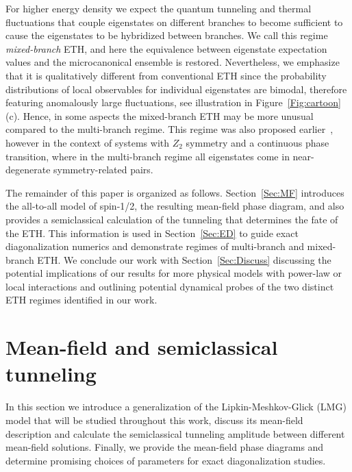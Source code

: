 \documentclass[aps,prx,showpacs,amsmath,amssymb,superscriptaddress,twocolumn,longbibliography,10pt,nofootinbib]{revtex4-2}
\begin{document}
For higher energy density we expect the quantum tunneling and thermal fluctuations that couple eigenstates on different branches to become sufficient to cause the eigenstates to be hybridized between branches. We call this regime \emph{mixed-branch} ETH, and here the equivalence between eigenstate expectation values and the microcanonical ensemble is restored. Nevertheless, we emphasize that it is qualitatively different from conventional ETH since the probability distributions of local observables for individual eigenstates are bimodal, therefore featuring anomalously large fluctuations, see illustration in Figure~\ref{Fig:cartoon}(c). Hence, in some aspects the mixed-branch ETH may be more unusual compared to the multi-branch regime. This regime was also proposed earlier~\cite{Huse14,Srednicki15,Srednicki16,SrednickiRigol2016}, however in the context of systems with $Z_2$ symmetry and a continuous phase transition, where in the multi-branch regime all eigenstates come in near-degenerate symmetry-related pairs.

The remainder of this paper is organized as follows. Section~\ref{Sec:MF} introduces the all-to-all model of spin-1/2, the resulting mean-field phase diagram, and also provides a semiclassical calculation of the tunneling that determines the fate of the ETH. This information is used in Section~\ref{Sec:ED} to  guide exact diagonalization numerics and demonstrate regimes of multi-branch and mixed-branch ETH. We conclude our work with Section~\ref{Sec:Discuss} discussing the potential implications of our results for more physical models with power-law or local interactions and outlining potential dynamical probes of the two distinct ETH regimes identified in our work. 

\section{Mean-field and semiclassical tunneling \label{Sec:MF}}

In this section we introduce a generalization of the Lipkin-Meshkov-Glick (LMG)  model that will be studied throughout this work, discuss its mean-field description and calculate the semiclassical tunneling amplitude between different mean-field solutions. Finally, we provide the mean-field phase diagrams and determine promising choices of parameters for exact diagonalization studies. 
\end{document}
